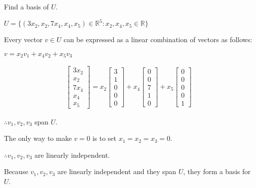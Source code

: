 \documentclass[fleqn]{article}
\begin{document}
\begin{enumerate}[nolistsep]
\begin{enumerate}[nolistsep]
				Find a basis of $U$.
				
				$U = \{(3x_2, x_2, 7x_4, x_4, x_5) \in \mathbb{R}^5 : x_2, x_4, x_5 \in \mathbb{R}\}$
				
				Every vector $v \in U$ can be expressed as a linear combination of vectors as follows:
				
				$v = x_2v_1 + x_4v_2 + x_5v_3$
				
				\begin{singlespacing}
					\setlength{\abovedisplayskip}{0pt}
					\setlength{\belowdisplayskip}{10pt}
					\setlength{\abovedisplayshortskip}{0pt}
					\setlength{\belowdisplayshortskip}{10pt}
					\setlength{\mathindent}{0pt}
					\begin{align*}
					\begin{bmatrix}3x_2 \\ x_2 \\ 7x_4 \\ x_4 \\ x_5 \end{bmatrix} = x_2 \begin{bmatrix}3 \\ 1 \\ 0 \\ 0 \\ 0 \end{bmatrix} + x_4 \begin{bmatrix}0 \\ 0 \\ 7 \\ 1 \\ 0 \end{bmatrix} + x_5 \begin{bmatrix}0 \\ 0 \\ 0 \\ 0 \\ 1 \end{bmatrix}
					\end{align*}
				\end{singlespacing}
				
				$\therefore v_1, v_2, v_3$ span $U$.
									
				The only way to make $v = 0$ is to set $x_1 = x_2 = x_3 = 0$.
				
				$\therefore v_1, v_2, v_3$ are linearly independent.
				
				Because $v_1, v_2, v_3$ are linearly independent and they span $U$, they form a basis for $U$.
				

\end{enumerate}
\end{enumerate}
\end{document}
